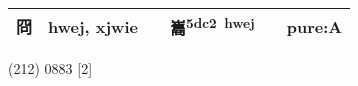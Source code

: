 \documentclass[14pt,a4paper]{scrartcl}
\begin{document}
\begin{longtable}[c]{@{}llllll@{}}
\begin{minipage}[t]{0.14\columnwidth}
冏
\strut\end{minipage} &
\begin{minipage}[t]{0.14\columnwidth}\raggedright\strut
hwej, xjwie
\strut\end{minipage} &
\begin{minipage}[t]{0.14\columnwidth}\raggedright\strut
\strut\end{minipage} &
\begin{minipage}[t]{0.14\columnwidth}\raggedright\strut
巂\textsuperscript{5dc2~hwej}
\strut\end{minipage} &
\begin{minipage}[t]{0.14\columnwidth}\raggedright\strut
\strut\end{minipage} &
\begin{minipage}[t]{0.14\columnwidth}\raggedright\strut
pure:A
\strut\end{minipage}\tabularnewline
\bottomrule
\end{longtable}

(212) 0883 {[}2{]}
\end{document}
